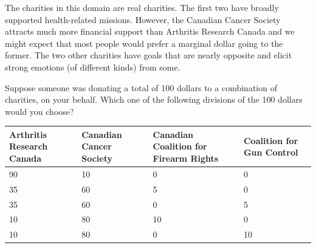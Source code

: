 The charities in this domain are real charities.
The first two have broadly supported health-related missions.
However, the Canadian Cancer Society attracts much more financial support than Arthritis Research Canada and we might expect that most people would prefer a marginal dollar going to the former.
The two other charities have goals that are nearly opposite and elicit strong emotions (of different kinds) from some.

\begin{tcolorbox}
Suppose someone was donating a total of 100 dollars to a combination of charities,
on your behalf.
Which one of the following divisions of the 100 dollars would you choose?

\begin{tabular}{p{35mm}|p{35mm}|p{35mm}|p{35mm}}
\hline
Arthritis Research Canada &
Canadian Cancer Society &
Canadian Coalition for Firearm Rights &
Coalition for Gun Control \\
\hline
90 & 10 & 0 & 0 \\
35 & 60 & 5 & 0 \\
35 & 60 & 0 & 5 \\
10 & 80 & 10 & 0 \\
10 & 80 & 0 & 10 \\
\hline
\end{tabular}
\end{tcolorbox}
